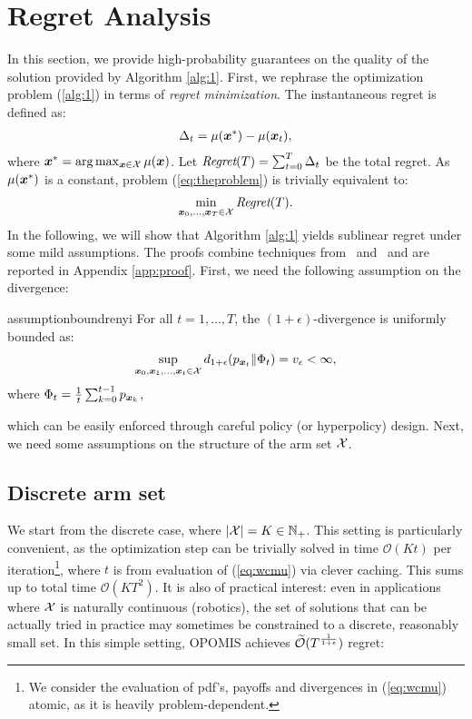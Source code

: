 \documentclass{article}
\makeatletter
\DeclareRobustCommand{\algoname}{OPOMIS\@\xspace}
\makeatother
\begin{document}
\section{Regret Analysis}\label{sec:regret}
In this section, we provide high-probability guarantees on the quality of the solution provided by Algorithm \ref{alg:1}.
First, we rephrase the optimization problem (\ref{alg:1}) in terms of \textit{regret minimization}. The instantaneous regret is defined as:
\begin{align}\label{eq:inregret}
	\Delta_t = \mu(\boldsymbol{x}^*) - \mu(\boldsymbol{x}_t),
\end{align}
where $\boldsymbol{x}^* = \arg\max_{\boldsymbol{x}\in\mathcal{X}}\mu(\boldsymbol{x})$. Let $\textit{Regret}(T) = \sum_{t=0}^T\Delta_t$ be the total regret.
As $\mu(\boldsymbol{x}^*)$ is a constant, problem (\ref{eq:theproblem}) is trivially equivalent to:
\begin{align}\label{eq:regret}
	\min_{\boldsymbol{x}_0,\dots,\boldsymbol{x}_T\in\mathcal{X}} \textit{Regret}(T).
\end{align}
In the following, we will show that Algorithm \ref{alg:1} yields sublinear regret under some mild assumptions. The proofs combine techniques from~\citet{srinivas2009gaussian} and~\citet{bubeck2013bandits} and are reported in Appendix \ref{app:proof}.
First, we need the following assumption on the \Renyi divergence:
%
\begin{restatable}{assumption}{boundrenyi}\label{ass:boundrenyi}
	For all $t=1,\dots,T$, the $(1+\epsilon)$-\Renyi divergence is uniformly bounded as:
	\begin{align*}
		\sup_{\boldsymbol{x}_0,\boldsymbol{x}_1,\dots,\boldsymbol{x}_t\in\mathcal{X}}d_{1+\epsilon}(p_{\boldsymbol{x}_t}\|\Phi_t) = v_{\epsilon} < \infty,
	\end{align*}
	where $\Phi_t = \frac{1}{t}\sum_{k=0}^{t-1}p_{\boldsymbol{x}_k}$,
\end{restatable}
%
which can be easily enforced through careful policy (or hyperpolicy) design. Next, we need some assumptions on the structure of the arm set $\mathcal{X}$.

\subsection{Discrete arm set}
We start from the discrete case, where $|\mathcal{X}| = K \in \mathbb{N}_{+}$.
This setting is particularly convenient, as the optimization step can be trivially solved in time $\mathcal{O}(Kt)$ per iteration\footnote{We consider the evaluation of pdf's, payoffs and \Renyi divergences in (\ref{eq:wcmu}) atomic, as it is heavily problem-dependent.}, where $t$ is from evaluation of (\ref{eq:wcmu}) via clever caching. This sums up to total time $\mathcal{O}(KT^2)$. It is also of practical interest: even in applications where $\mathcal{X}$ is naturally continuous (\eg robotics), the set of solutions that can be actually tried in practice may sometimes be constrained to a discrete, reasonably small set. In this simple setting, \algoname achieves $\widetilde{\mathcal{O}}(T^{\frac{1}{1+\epsilon}})$ regret:
\end{document}
